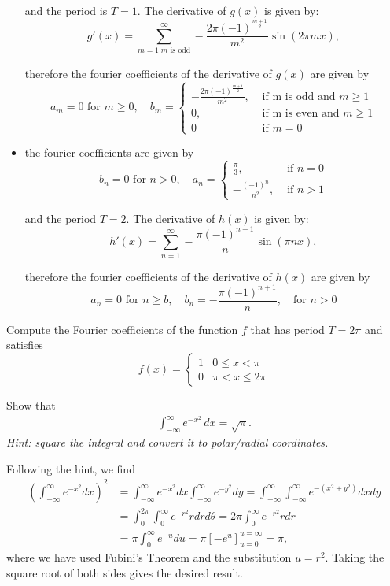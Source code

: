 \documentclass[11pt]{article}
\begin{document}
\begin{solution}
\begin{itemize}
and the period is $T = 1$. The derivative of $g(x)$ is given by:
$$
g'(x) = \sum_{m=1|m \text{ is odd}}^{\infty} -\frac{2\pi (-1)^{\frac{m+1}{2}}}{m^2}\sin(2\pi m x),
$$

therefore the fourier coefficients of the derivative of $g(x)$ are given by 
$$
a_m = 0 \text{ for } m \geq 0, \quad b_m = \begin{cases}-\frac{2\pi (-1)^{\frac{m+1}{2}}}{m^2}, & \text { if m is odd and }m \geq 1 \\ 0, & \text{ if m is even and } m \geq 1\\ 0 & \text{ if } m = 0  \end{cases} 
$$
\item 
the fourier coefficients are given by 
$$
b_n = 0 \text{ for } n >0, \quad a_n = \begin{cases}\frac{\pi}{3}, & \text { if }n = 0 \\ -\frac{(-1)^n}{n^2}, & \text{ if } n > 1 \end{cases} 
$$

and the period $T = 2$. The derivative of $h(x)$ is given by:
$$
h'(x) =\sum_{n=1}^{\infty} -\frac{\pi(-1)^{n+1}}{n}\sin(\pi n x),
$$

therefore the fourier coefficients of the derivative of $h(x)$ are given by 
$$
a_n = 0 \text{ for } n \geq b, \quad b_n = -\frac{\pi(-1)^{n+1}}{n},\quad \text{for }n > 0
$$
\end{itemize}
\end{solution}

\begin{exercise}
    Compute the Fourier coefficients of the function $f$ that has period $T = 2\pi$ and satisfies
    \[
        f(x) = \left\{\begin{array}{ll} 1 & 0 \leq x < \pi \\ 0 & \pi < x \leq 2\pi \end{array}\right.
    \]
 
Show that 
\begin{align}
    \int_{-\infty}^{\infty} e^{-x^2} \, dx = \sqrt{\pi}. 
\end{align}
\textit{Hint: square the integral and convert it to polar/radial coordinates.}
\end{exercise}
\begin{solution}
    Following the hint, we find
    \begin{align}
        \left(\int_{-\infty}^\infty e^{-x^2} dx\right)^2 &= \int_{-\infty}^\infty e^{-x^2} dx \int_{-\infty}^\infty e^{-y^2} dy = \int_{-\infty}^\infty \int_{-\infty}^\infty e^{-(x^2 + y^2)} dx dy\\
        &= \int_0^{2\pi} \int_0^\infty e^{-r^2} r dr d\theta = 2\pi \int_0^\infty e^{-r^2} r dr \\
        &= \pi \int_0^\infty e^{-u} du = \pi [-e^u]_{u=0}^{u=\infty} = \pi,
    \end{align}
    where we have used Fubini's Theorem and the substitution $u = r^2$. Taking the square root of both sides gives the desired result.
\end{solution}
\end{document}
